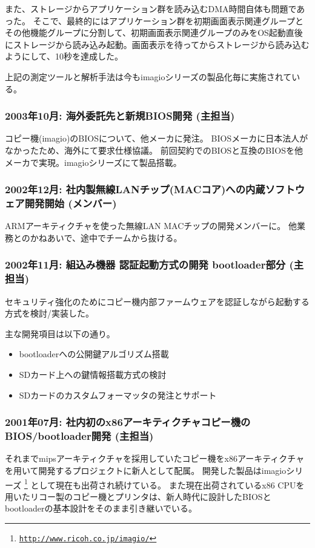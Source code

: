 \documentclass[letterpaper]{article}
\begin{document}
また、ストレージからアプリケーション群を読み込むDMA時間自体も問題であった。
そこで、最終的にはアプリケーション群を初期画面表示関連グループとその他機能グループに分割して、初期画面表示関連グループのみをOS起動直後にストレージから読み込み起動。画面表示を待ってからストレージから読み込むようにして、10秒を達成した。

上記の測定ツールと解析手法は今もimagioシリーズの製品化毎に実施されている。

\subsubsection*{2003年10月: 海外委託先と新規BIOS開発 (主担当)}
コピー機(imagio)のBIOSについて、他メーカに発注。
BIOSメーカに日本法人がなかったため、海外にて要求仕様協議。
前回契約でのBIOSと互換のBIOSを他メーカで実現。imagioシリーズにて製品搭載。

\subsubsection*{2002年12月: 社内製無線LANチップ(MACコア)への内蔵ソフトウェア開発開始 (メンバー)}
ARMアーキティクチャを使った無線LAN MACチップの開発メンバーに。
他業務とのかねあいで、途中でチームから抜ける。

\subsubsection*{2002年11月: 組込み機器 認証起動方式の開発 bootloader部分 (主担当)}
セキュリティ強化のためにコピー機内部ファームウェアを認証しながら起動する方式を検討/実装した。

主な開発項目は以下の通り。
\begin{itemize}
  \item bootloaderへの公開鍵アルゴリズム搭載
  \item SDカード上への鍵情報搭載方式の検討
  \item SDカードのカスタムフォーマッタの発注とサポート
\end{itemize}

\subsubsection*{2001年07月: 社内初のx86アーキティクチャコピー機のBIOS/bootloader開発 (主担当)}
それまでmipsアーキティクチャを採用していたコピー機をx86アーキティクチャを用いて開発するプロジェクトに新人として配属。
開発した製品はimagioシリーズ
\footnote{\href{http://www.ricoh.co.jp/imagio/}{\tt http://www.ricoh.co.jp/imagio/}}
として現在も出荷され続けている。
また現在出荷されているx86 CPUを用いたリコー製のコピー機とプリンタは、新人時代に設計したBIOSとbootloaderの基本設計をそのまま引き継いでいる。
\end{document}

